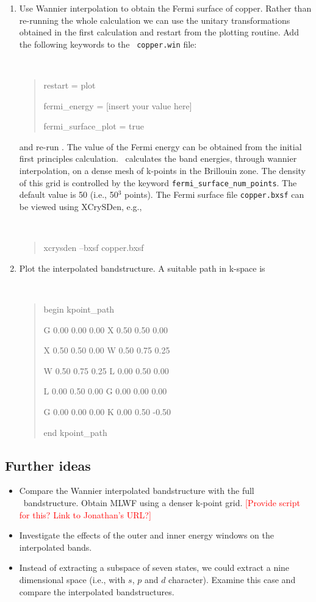 \documentclass[a4paper,11pt,twoside]{article}
\def\tent#1{\textcolor{red}{#1}}     %
\begin{document}
\begin{enumerate}
\item Use Wannier interpolation to obtain the Fermi surface of
  copper. Rather than re-running the whole calculation we can use the
  unitary transformations obtained in the first calculation and restart
  from the plotting routine. Add the following keywords to the {\tt
    copper.win} file:
{\tt
\begin{quote}
restart = plot

fermi\_energy = [insert your value here] 

fermi\_surface\_plot = true
\end{quote} }
and re-run \wannier. The value of the Fermi energy can be  
obtained from the initial first principles calculation. \wannier\
calculates the band energies, through wannier interpolation, on a
dense mesh of k-points in the Brillouin zone. The density of this grid is
controlled by the keyword {\tt fermi\_surface\_num\_points}. The default
value is 50 (i.e., 50$^3$ points).
The Fermi surface file {\tt copper.bxsf} can be viewed using XCrySDen,
e.g., 
{\tt
\begin{quote}
xcrysden --bxsf copper.bxsf
\end{quote} }


\item Plot the interpolated bandstructure. A suitable path in k-space is
\smallskip
{\tt
\begin{quote}
begin kpoint\_path

G 0.00  0.00  0.00    X 0.50  0.50  0.00

X 0.50  0.50  0.00    W 0.50  0.75  0.25

W 0.50  0.75  0.25    L 0.00  0.50  0.00

L 0.00  0.50  0.00    G 0.00  0.00  0.00

G 0.00  0.00  0.00    K 0.00  0.50 -0.50
 
end kpoint\_path
\end{quote} }
\end{enumerate}

\subsection*{Further ideas}
\begin{itemize}
\item Compare the Wannier interpolated bandstructure with the full
  \pwscf\ bandstructure. Obtain MLWF using a denser k-point grid.
\tent{{[Provide script for this? Link to Jonathan's URL?]}}
\item Investigate the effects of the outer and inner energy windows on
  the interpolated bands. 
\item Instead of extracting a subspace of seven states, we could
  extract a nine dimensional space (i.e., with $s$, $p$ and $d$
  character). Examine this case and compare the interpolated
  bandstructures.
\end{itemize}
\end{document}
